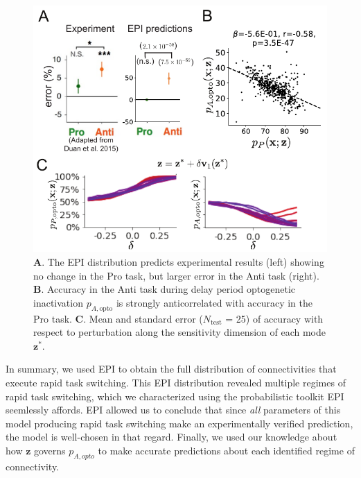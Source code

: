 \documentclass[11pt]{article}
\begin{document}
\begin{figure}
\begin{center}
\includegraphics[scale=0.8]{figures/fig5/fig5.pdf}
\end{center}
\caption{\footnotesize 
\textbf{A}. The EPI distribution predicts experimental results (left) showing no change in the Pro task, but larger error in the Anti task (right).
\textbf{B}. Accuracy in the Anti task during delay period optogenetic inactivation $p_{A,\text{opto}}$ is strongly anticorrelated with accuracy in the Pro task.
\textbf{C}. Mean and standard error ($N_{\text{test}}$ = 25) of accuracy with respect to perturbation along the sensitivity dimension of each mode $\mathbf{z}^*$.
}
\label{fig:SC_opt}
\end{figure}

In summary, we used EPI to obtain the full distribution of connectivities that execute rapid task switching.
This EPI distribution revealed multiple regimes of rapid task switching, which we characterized using the probabilistic toolkit EPI seemlessly affords.
EPI allowed us to conclude that since \textit{all} parameters of this model producing rapid task switching make an experimentally verified prediction, the model is well-chosen in that regard.
Finally, we used our knowledge about how $\mathbf{z}$ governs $p_{A,opto}$ to make accurate predictions about each identified regime of connectivity.

\end{document}
